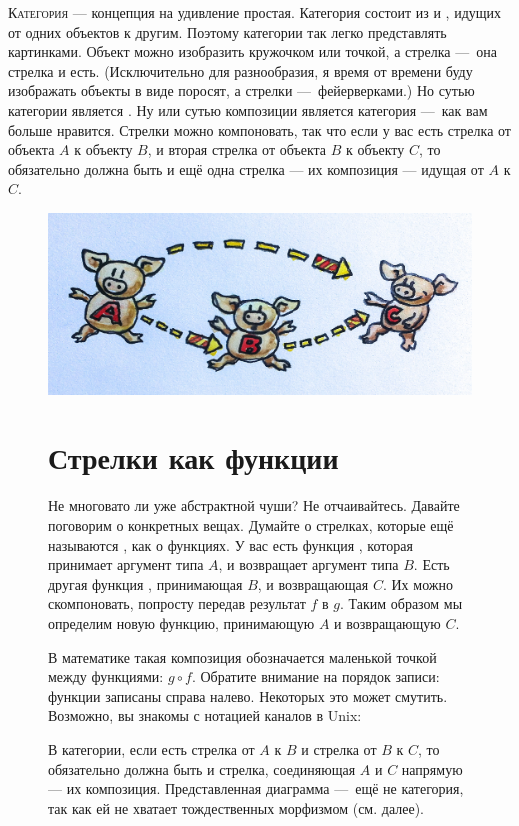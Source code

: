 \lettrine[lhang=0.17]{К}{атегория} — концепция на удивление простая.
Категория состоит из  и , идущих от одних объектов к другим.
Поэтому категории так легко представлять картинками. Объект можно изобразить кружочком или точкой,
а стрелка — она стрелка и есть. (Исключительно для разнообразия, я время от времени буду изображать
объекты в виде поросят, а стрелки — фейерверками.) Но сутью категории является .
Ну или сутью композиции является категория — как вам больше нравится. Стрелки можно компоновать, так
что если у вас есть стрелка от объекта $A$ к объекту $B$, и вторая стрелка от объекта $B$ к объекту $C$,
то обязательно должна быть и ещё одна стрелка  --- их композиция --- идущая от $A$ к $C$.

\begin{figure}
\centering
\includegraphics[width=\textwidth]{images/img_1330.jpg}
\caption{В категории, если есть стрелка от $A$ к $B$ и стрелка от $B$ к $C$, то обязательно должна быть и стрелка,
соединяющая $A$ и $C$ напрямую — их композиция. Представленная диаграмма — ещё не категория, так как ей не хватает
тождественных морфизмом (см. далее).}

\section{Стрелки как функции}\label{стрелки-как-функции}

Не многовато ли уже абстрактной чуши? Не отчаивайтесь. Давайте поговорим о конкретных вещах.
Думайте о стрелках, которые ещё называются , как о функциях.
У вас есть функция , которая принимает аргумент типа $A$, и возвращает аргумент типа $B$.
Есть другая функция , принимающая $B$, и возвращающая $C$. Их можно скомпоновать, попросту
передав результат $f$ в $g$. Таким образом мы определим новую функцию, принимающую $A$ и возвращающую $C$.

В математике такая композиция обозначается маленькой точкой между функциями: \ensuremath{g \circ f}.
Обратите внимание на порядок записи: функции записаны справа налево. Некоторых это может смутить. Возможно, вы знакомы
с нотацией каналов в Unix:


\end{figure}
